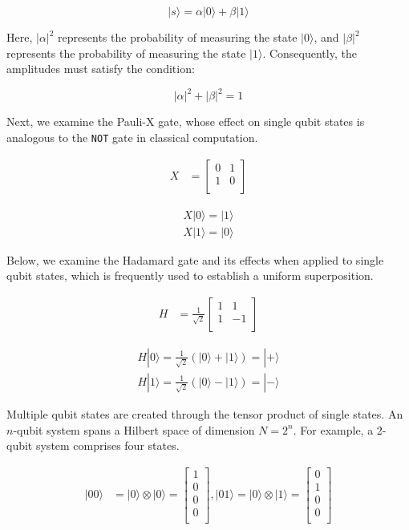 \documentclass[msc,oneside]{ubcthesis}
\begin{document}
	$$|s\rangle = \alpha|0\rangle + \beta|1\rangle$$
	
	Here, $|\alpha|^2$ represents the probability of measuring the state $|0\rangle$, and $|\beta|^2$ represents the probability of measuring the state $|1\rangle$. Consequently, the amplitudes must satisfy the condition:
	
	$$|\alpha|^2 + |\beta|^2 = 1$$
	
	Next, we examine the Pauli-X gate, whose effect on single qubit states is analogous to the \texttt{NOT} gate in classical computation.
	
		\begin{align*}	
		X &= \begin{bmatrix}
			0 & 1 \\
			1 &0 \\
		\end{bmatrix}
	\end{align*}
	
	\begin{align*}	
		X|0\rangle = |1\rangle\\
		X|1\rangle = |0\rangle
	\end{align*}
	
	
	Below, we examine the Hadamard gate and its effects when applied to single qubit states, which is frequently used to establish a uniform superposition.

	
	\begin{align*}	
		H &=\frac{1}{\sqrt{2}} \begin{bmatrix}
			1 & 1 \\
			1 &-1 \\
		\end{bmatrix}
	\end{align*}
	
	\begin{align*}	
		H|0\rangle = \frac{1}{\sqrt{2}} (|0\rangle + |1\rangle) = |+\rangle\\
		H|1\rangle = \frac{1}{\sqrt{2}} (|0\rangle - |1\rangle) = |-\rangle
	\end{align*}
	
	
Multiple qubit states are created through the tensor product of single states. An $n$-qubit system spans a Hilbert space of dimension $N = 2^n$. For example, a 2-qubit system comprises four states.
	
	\begin{align*}	
		|00\rangle &= |0\rangle \otimes |0\rangle = \begin{bmatrix}
			1 \\
			0 \\
			0 \\
			0 \\
		\end{bmatrix}, 
		|01\rangle = |0\rangle \otimes |1\rangle = \begin{bmatrix}
			0 \\
			1 \\
			0 \\
			0 \\
		\end{bmatrix} 			
	\end{align*}
	
\end{document}
